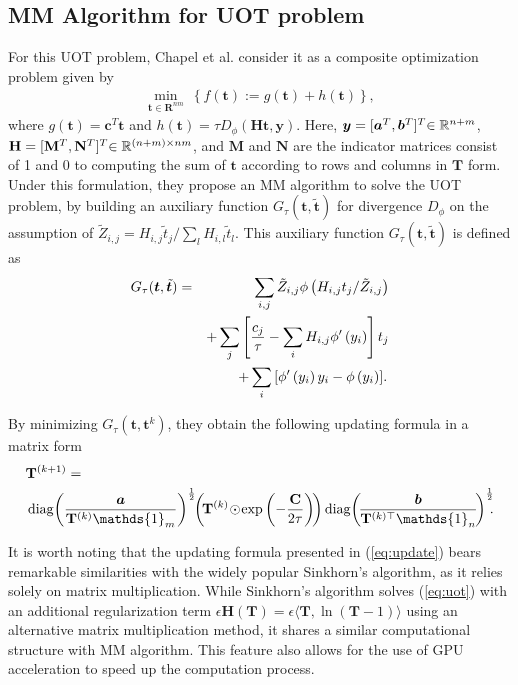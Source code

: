 \documentclass[conference]{IEEEtran}
\newcommand{\one}{\mathds{1}}
\newcommand{\mat}[1]{\mathbf{#1}}
\renewcommand{\vec}[1]{\bm{#1}}
\newcommand{\changeSX}[1]{\textcolor{black}{#1}}
\begin{document}
\subsection{MM Algorithm for UOT problem}
For this UOT problem, Chapel et al. consider it as a composite optimization problem \cite{Chapel_NeurIPS_2021} given by
\begin{align}
\label{eq:reg}
\min_{\vec t \in \mat{R}^{nm}} ~ \left\{ f(\vec t) := g(\vec t) + h(\vec t)\right\},
\end{align}
where $g(\vec t) = \vec c^{T}\vec t$ and $h(\vec t) = \tau D_{\phi}(\mat H \vec t, \vec y)$. Here, $\vec y = [\vec a^{T}, \vec b^{T}]^{T} \changeSX{\in \mathbb{R}^{n+m}}$, $\mat H = [\mat {M}^{T}, \mat {N}^{T}]^{T} \changeSX{\in \mathbb{R}^{(n+m) \times nm}}$, and $\mat {M} $ and $\mat {N}$ are the indicator matrices consist of 1 and 0 to computing the sum of $\vec t$ according to rows and columns in $\mat T$ form. Under this formulation, they propose an MM algorithm to solve the UOT problem, by building an auxiliary function $G_\tau(\boldsymbol{t}, \tilde{\boldsymbol{t}})$ for divergence $D_{\phi}$ on the assumption of $\tilde{Z}_{i, j}=H_{i, j} \tilde{t}_j/\sum_l H_{i, l} \tilde{t}_l$. This auxiliary function $G_\tau(\boldsymbol{t}, \tilde{\boldsymbol{t}})$ is defined as
\begin{eqnarray}
\label{eq:af}
G_\tau(\boldsymbol{t}, \tilde{\boldsymbol{t}})&=&\sum_{i, j} \tilde{Z}_{i, j} \phi\left({H_{i, j} t_j}/{\tilde{Z}_{i, j}}\right)\notag\\
&&+\sum_j\left[\frac{c_j}{\tau}-\sum_i H_{i, j} \phi^{\prime}\left(y_i\right)\right] t_j\notag\\
&&+\sum_i\left[\phi^{\prime}\left(y_i\right) y_i-\phi\left(y_i\right)].\right.
\end{eqnarray}

By minimizing $G_{\tau}( \vec t, \vec t^{k}) $, they obtain the following updating formula in a matrix form
\begin{align}
\label{eq:update}
&\mat{T}^{(k+1)}=\notag\\
&\operatorname{diag}\!\left(\frac{\vec a}{\mat{T}^{(k)} \one_m}\right)^{\frac{1}{2}}
\!\!\left(\!\mat{T}^{(k)} \!\odot\! \exp \left(-\frac{\mat C}{2 \tau}\right)\!\right)
\operatorname{diag}\!\left(\!\frac{\vec{b}}{\mat{T}^{(k) \top} \one_n}\!\right)^{\frac{1}{2}}\!\!\!.\notag\\
\end{align}

It is worth noting that the updating formula presented in (\ref{eq:update}) bears remarkable similarities with the widely popular Sinkhorn's algorithm, as it relies solely on matrix multiplication. While Sinkhorn's algorithm solves (\ref{eq:uot}) with an additional regularization term $\epsilon \mat H(\mat T) = \epsilon \langle \mat T,\ln(\mat T - 1)\rangle$ using an alternative matrix multiplication method, it shares a similar computational structure with MM algorithm. This feature also allows for the use of GPU acceleration to speed up the computation process.
\end{document}
